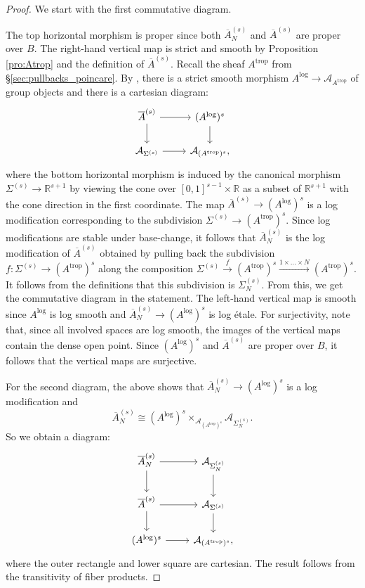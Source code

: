\documentclass[11pt]{article}
\newcommand{\trop}{\mathrm{trop}}
\renewcommand{\log}{\mathrm{log}}
\newcommand{\barA}{\overline{A}}
\newcommand{\logA}{{A^{\log}}}
\newcommand{\tropA}{{A^{\trop}}}
\theoremstyle{definition}
\begin{document}
\begin{proof}
	We start with the first commutative diagram.

	The top horizontal morphism is proper since both $\barA_N^{(s)}$ and $\barA^{(s)}$ are proper over $B$. The right-hand
	vertical map is strict and smooth by Proposition \ref{pro:Atrop} and the definition of $\barA^{(s)}$. Recall the sheaf
	$\tropA$ from \S\ref{sec:pullbacks_poincare}.
	By \cite[9.3]{KKN7}, there is a strict smooth morphism $\logA\to \mathcal{A}_{\tropA}$ of group objects and there is a cartesian diagram:
	$$\begin{tikzcd}
		\barA^{(s)}\arrow[d]\arrow[r]&(\logA)^{s}\arrow[d]\\
		\mathcal{A}_{\Sigma^{(s)}}\arrow[r]&\mathcal{A}_{(\tropA)^{s}},
	\end{tikzcd}$$
	where the bottom horizontal morphism is induced by the canonical morphism $\Sigma^{(s)}\to \mathbb{R}^{s+1}$ by viewing
	the cone over $[0,1]^{s-1}\times \mathbb{R}$ as a subset of $\mathbb{R}^{s+1}$ with the cone direction in the first coordinate.
	The map $\barA^{(s)}\to (\logA)^{s}$ is a log modification corresponding to the subdivision
	$\Sigma^{(s)}\to (\tropA)^{s}$. Since log modifications are stable under base-change, it
	follows that $\barA_N^{(s)}$ is the log modification of $\barA^{(s)}$ obtained by pulling back the subdivision
	$f:\Sigma^{(s)}\to (\tropA)^{s}$ along the composition $\Sigma^{(s)}\xrightarrow{f} (\tropA)^{s}\xrightarrow{1\times\dots\times N} (\tropA)^{s}$.
	It follows from the definitions that this subdivision is $\Sigma_N^{(s)}$. From this, we get the commutative
	diagram in the statement. The left-hand vertical map is smooth since $\logA$ is log smooth and $\barA_N^{(s)}\to (\logA)^{s}$
	is log \'etale. For surjectivity, note that, since all involved spaces are log smooth, the images of the vertical maps contain
	the dense open point. Since $(\logA)^{s}$ and $\barA^{(s)}$ are proper over $B$, it follows that the vertical maps are surjective.

	For the second diagram, the above shows that $\barA_N^{(s)}\to (\logA)^{s}$ is a log modification and
	$$\barA_N^{(s)}\cong (\logA)^{s}\times_{\mathcal{A}_{(\tropA)^{s}}}\mathcal{A}_{\Sigma_N^{(s)}}.$$
	So we obtain a diagram:
	$$\begin{tikzcd}
		\barA_N^{(s)}\arrow[d]\arrow[r]&\mathcal{A}_{\Sigma_N^{(s)}}\arrow[d]\\
		\barA^{(s)}\arrow[d]\arrow[r]&\mathcal{A}_{\Sigma^{(s)}}\arrow[d]\\
		(\logA)^{s}\arrow[r]&\mathcal{A}_{(\tropA)^{s}},
	\end{tikzcd}$$
	where the outer rectangle and lower square are cartesian. The result follows from the transitivity
	of fiber products.
\end{proof}
\end{document}
